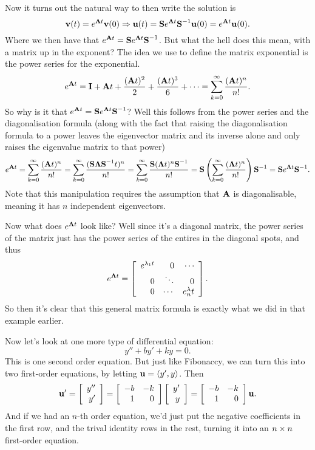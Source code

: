 Now it turns out the natural way to then write the solution is
\[ \vv(t) = e^{\mLa t}\vv(0) \Rightarrow \vu(t) = \mS e^{\mLa t} \mS^{-1} \vu(0) = e^{\mA t} \vu (0). \]
Where we then have that $e^{\mA t} = \mS e^{\mLa t} \mS^{-1}$. But what the hell does this mean, with a matrix up in the exponent? The idea we use to define the matrix exponential is the power series for the exponential.
\bdf
\[ e^{\mA t} = \mI + \mA t + \frac{(\mA t)^2}2 + \frac{(\mA t)^3}6 + \cdots = \sum_{k = 0}^\infty \frac{(\mA t)^n}{n!}. \]
\edf
So why is it that $e^{\mA t} = \mS e^{\mLa t} \mS^{-1}$? Well this follows from the power series and the diagonalisation formula (along with the fact that raising the diagonalisation formula to a power leaves the eigenvector matrix and its inverse alone and only raises the eigenvalue matrix to that power)
\[ e^{\mA t} = \sum_{k = 0}^\infty \frac{(\mA t)^n}{n!} = \sum_{k = 0}^\infty \frac{(\mS\mLa\mS^{-1} t)^n}{n!} = \sum_{k = 0}^\infty \frac{\mS(\mLa t)^n\mS^{-1}}{n!} = \mS \left(\sum_{k = 0}^\infty \frac{(\mLa t)^n}{n!} \right)\mS^{-1} = \mS e^{\mLa t} \mS^{-1}. \]
Note that this manipulation requires the assumption that $\mA$ is diagonalisable, meaning it has $n$ independent eigenvectors. 

Now what does $e^{\mLa t}$ look like? Well since it's a diagonal matrix, the power series of the matrix just has the power series of the entires in the diagonal spots, and thus
\[ e^{\mLa t} = \mat{e^{\lambda_1t}&0&\cdots\\0&\ddots&0\\0&\cdots&e^\lambda_nt}. \]
So then it's clear that this general matrix formula is exactly what we did in that example earlier. 

Now let's look at one more type of differential equation:
\[ y'' + by' + ky = 0. \]
This is one second order equation. But just like Fibonaccy, we can turn this into two first-order equations, by letting $\vu = \rvec{y',y}$. Then
\[ \vu' = \mat{y''\\y'} = \mat{-b&-k\\1&0}\mat{y'\\y} = \mat{-b&-k\\1&0}\vu. \]
And if we had an $n$-th order equation, we'd just put the negative coefficients in the first row, and the trival identity rows in the rest, turning it into an $n \by n$ first-order equation.
